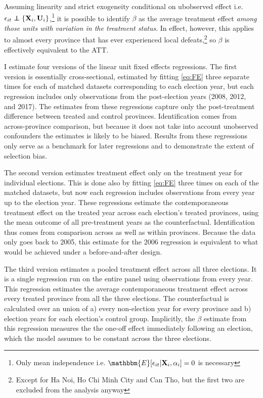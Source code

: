 \documentclass[12pt]{article}\usepackage[]{graphicx}\usepackage[]{color}
\newcommand{\1}{\mathbbm{1}}
\newcommand\E{\mathbbm{E}}
\newcommand\indep{\protect\mathpalette{\protect\independenT}{\perp}}
\def\independenT#1#2{\mathrel{\rlap{$#1#2$}\mkern2mu{#1#2}}}
\begin{document}
Assuming linearity and strict exogeneity conditional on ubobserved effect i.e. $\epsilon_{it} \indep \{\mathbf{X}_i, \mathbf{U}_i\}$,\footnote{Only mean independence i.e. $\E[\epsilon_{it} | \mathbf{X}_i, \alpha_i] = 0$ is necessary} it is possible to identify $\beta$ as the average treatment effect \textit{among those units with variation in the treatment status}. In effect, however, this applies to almost every province that has ever experienced local defeats,\footnote{Except for Ha Noi, Ho Chi Minh City and Can Tho, but the first two are excluded from the analysis anyway} so $\beta$ is effectively equivalent to the ATT.

I estimate four versions of the linear unit fixed effects regressions. The first version is essentially cross-sectional, estimated by fitting \ref{eq:FE} three separate times for each of matched datasets corresponding to each election year, but each regression includes only observations from the post-election years (2008, 2012, and 2017). The estimates from these regressions capture only the post-treatment difference between treated and control provinces. Identification comes from across-province comparison, but because it does not take into account unobserved confounders the estimates is likely to be biased. Results from these regressions only serve as a benchmark for later regressions and to demonstrate the extent of selection bias.

The second version estimates treatment effect only on the treatment year for individual elections. This is done also by fitting \ref{eq:FE} three times on each of the matched datasets, but now each regression includes observations from every year up to the election year. These regressions estimate the contemporaneous treatment effect on the treated year across each election's treated provinces, using the mean outcome of all pre-treatment years as the counterfactual. Identification thus comes from comparison across as well as within provinces. Because the data only goes back to 2005, this estimate for the 2006 regression is equivalent to what would be achieved under a before-and-after design.

The third version estimates a pooled treatment effect across all three elections. It is a single regression run on the entire panel using observations from every year. This regression estimates the average contemporaneous treatment effect across every treated province from all the three elections. The counterfactual is calculated over an union of a) every non-election year for every province and b) election years for each election's control group. Implicitly, the $\beta$ estimate from this regression measures the the one-off effect immediately following an election, which the model assumes to be constant across the three elections.
\end{document}
